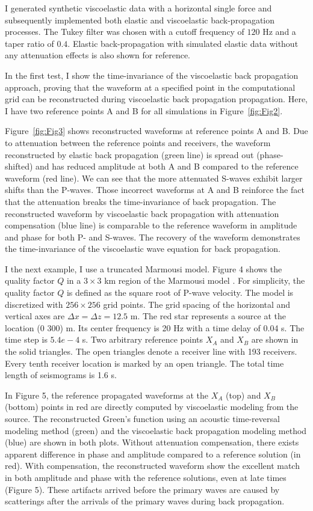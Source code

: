 I generated synthetic viscoelastic data with a horizontal single force and subsequently implemented both elastic and viscoelastic back-propagation processes. The Tukey filter was chosen with a cutoff frequency of $120$ Hz and a taper ratio of $0.4$. Elastic back-propagation with simulated elastic data without any attenuation effects is also shown for reference. 
 
In the first test, I show the time-invariance of the viscoelastic back propagation approach, proving that the waveform at a specified point in the computational grid can be reconstructed during viscoelastic back propagation propagation. Here, I have two reference points A and B for all simulations in Figure~\ref{fig:Fig2}. 

Figure~\ref{fig:Fig3} shows reconstructed waveforms at reference points A and B. Due to attenuation between the reference points and receivers, the waveform reconstructed by elastic back propagation (green line) is spread out (phase-shifted) and has reduced amplitude at both A and B compared to the reference waveform (red line). We can see that the more attenuated S-waves exhibit larger shifts than the P-waves. Those incorrect waveforms at A and B reinforce the fact that the attenuation breaks the time-invariance of back propagation. The reconstructed waveform by viscoelastic back propagation with attenuation compensation (blue line) is comparable to the reference waveform in amplitude and phase for both P- and S-waves. The recovery of the waveform demonstrates the time-invariance of the viscoelastic wave equation for back propagation. 

I the next example, I use a truncated Marmousi model. Figure 4 shows the quality factor $Q$ in a $3\times 3$ km region of the Marmousi model \citep{versteeg1993}. For simplicity, the quality factor $Q$ is defined as the square root of P-wave velocity. The model is discretized with $256\times 256$ grid points. The grid spacing of the horizontal and vertical axes are $\Delta x=\Delta z=12.5$  m. The red star represents a source at the location (0 300) m. Its center frequency is 20 Hz with a time delay of 0.04 s. The time step is $5.4e-4$ s. Two arbitrary reference points $X_A$ and $X_B$ are shown in the solid triangles. The open triangles denote a receiver line with 193 receivers. Every tenth receiver location is marked by an open triangle. The total time length of seismograms is 1.6 s.

In Figure 5, the reference propagated waveforms at the $X_A$ (top) and $X_B$ (bottom) points in red are directly computed by viscoelastic modeling from the source. The reconstructed Green’s function using an acoustic time-reversal modeling method (green) and the viscoelastic back propagation modeling method (blue) are shown in both plots. Without attenuation compensation, there exists apparent difference in phase and amplitude compared to a reference solution (in red). With compensation, the reconstructed waveform show the excellent match in both amplitude and phase with the reference solutions, even at late times (Figure 5). These artifacts arrived before the primary waves are caused by scatterings after the arrivals of the primary waves during back propagation. 

